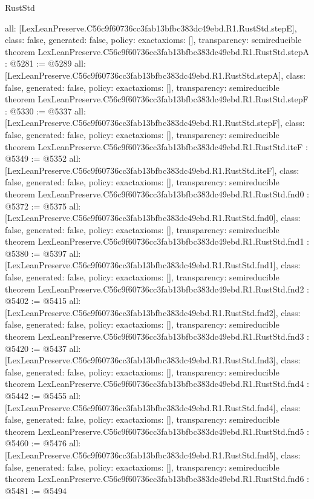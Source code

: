 \begin{lexlean}{RustStd}
\begin{coremodule}
{  all: [LexLeanPreserve.C56c9f60736cc3fab13bfbc383dc49ebd.R1.RustStd.stepE],
  class: false,
  generated: false,
  policy: exact{axioms: []},
  transparency: semireducible
}
theorem LexLeanPreserve.C56c9f60736cc3fab13bfbc383dc49ebd.R1.RustStd.stepA : @5281 := @5289 {
  all: [LexLeanPreserve.C56c9f60736cc3fab13bfbc383dc49ebd.R1.RustStd.stepA],
  class: false,
  generated: false,
  policy: exact{axioms: []},
  transparency: semireducible
}
theorem LexLeanPreserve.C56c9f60736cc3fab13bfbc383dc49ebd.R1.RustStd.stepF : @5330 := @5337 {
  all: [LexLeanPreserve.C56c9f60736cc3fab13bfbc383dc49ebd.R1.RustStd.stepF],
  class: false,
  generated: false,
  policy: exact{axioms: []},
  transparency: semireducible
}
theorem LexLeanPreserve.C56c9f60736cc3fab13bfbc383dc49ebd.R1.RustStd.iteF : @5349 := @5352 {
  all: [LexLeanPreserve.C56c9f60736cc3fab13bfbc383dc49ebd.R1.RustStd.iteF],
  class: false,
  generated: false,
  policy: exact{axioms: []},
  transparency: semireducible
}
theorem LexLeanPreserve.C56c9f60736cc3fab13bfbc383dc49ebd.R1.RustStd.fnd0 : @5372 := @5375 {
  all: [LexLeanPreserve.C56c9f60736cc3fab13bfbc383dc49ebd.R1.RustStd.fnd0],
  class: false,
  generated: false,
  policy: exact{axioms: []},
  transparency: semireducible
}
theorem LexLeanPreserve.C56c9f60736cc3fab13bfbc383dc49ebd.R1.RustStd.fnd1 : @5380 := @5397 {
  all: [LexLeanPreserve.C56c9f60736cc3fab13bfbc383dc49ebd.R1.RustStd.fnd1],
  class: false,
  generated: false,
  policy: exact{axioms: []},
  transparency: semireducible
}
theorem LexLeanPreserve.C56c9f60736cc3fab13bfbc383dc49ebd.R1.RustStd.fnd2 : @5402 := @5415 {
  all: [LexLeanPreserve.C56c9f60736cc3fab13bfbc383dc49ebd.R1.RustStd.fnd2],
  class: false,
  generated: false,
  policy: exact{axioms: []},
  transparency: semireducible
}
theorem LexLeanPreserve.C56c9f60736cc3fab13bfbc383dc49ebd.R1.RustStd.fnd3 : @5420 := @5437 {
  all: [LexLeanPreserve.C56c9f60736cc3fab13bfbc383dc49ebd.R1.RustStd.fnd3],
  class: false,
  generated: false,
  policy: exact{axioms: []},
  transparency: semireducible
}
theorem LexLeanPreserve.C56c9f60736cc3fab13bfbc383dc49ebd.R1.RustStd.fnd4 : @5442 := @5455 {
  all: [LexLeanPreserve.C56c9f60736cc3fab13bfbc383dc49ebd.R1.RustStd.fnd4],
  class: false,
  generated: false,
  policy: exact{axioms: []},
  transparency: semireducible
}
theorem LexLeanPreserve.C56c9f60736cc3fab13bfbc383dc49ebd.R1.RustStd.fnd5 : @5460 := @5476 {
  all: [LexLeanPreserve.C56c9f60736cc3fab13bfbc383dc49ebd.R1.RustStd.fnd5],
  class: false,
  generated: false,
  policy: exact{axioms: []},
  transparency: semireducible
}
theorem LexLeanPreserve.C56c9f60736cc3fab13bfbc383dc49ebd.R1.RustStd.fnd6 : @5481 := @5494 {
}
\end{coremodule}
\end{lexlean}
